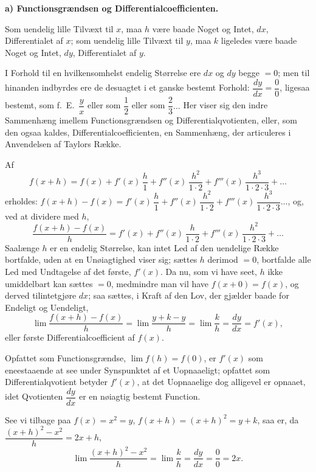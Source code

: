 \documentclass[12pt]{book}
\newcommand{\opage}[1]{\marginnote{\footnotesize\textit{[#1]}}}
\begin{document}
\begin{center}
\textbf{a) Functionsgrændsen og Differentialcoefficienten.}
\end{center}
{}

Som uendelig lille Tilvæxt til $x$, maa $h$ være baade Noget og Intet, $dx$,
Differentialet af $x$; som uendelig lille Tilvæxt til $y$, maa $k$ ligeledes være
baade Noget og Intet, $dy$, Differentialet af $y$.

I Forhold til en hvilkensomhelst endelig Størrelse ere $dx$ og $dy$ begge $= 0$;
men til hinanden indbyrdes ere de desuagtet i et ganske bestemt Forhold:
$\dfrac{dy}{dx} = \dfrac{0}{0}$, ligesaa bestemt, som f.\ E.\ $\dfrac{y}{x}$ eller
som $\dfrac{1}{2}$ eller som $\dfrac{2}{3} \dots$ Her viser sig den indre
Sammenhæng imellem Functionsgrændsen og Differentialqvotienten, eller, som den
ogsaa kaldes, Differentialcoefficienten, en Sammenhæng, der articuleres i
Anvendelsen af Taylors Række.

Af
\[
f(x + h) = f(x) + f'(x)\,\frac{h}{1} + f''(x)\,\frac{h^{2}}{1\cdot2}
+ f'''(x)\,\frac{h^{3}}{1\cdot2\cdot3} + \dots
\]
erholdes: $f(x + h) - f(x) = f'(x)\,\dfrac{h}{1} + f''(x)\,\dfrac{h^{2}}{1\cdot2}
+ f'''(x)\,\dfrac{h^{3}}{1\cdot2\cdot3} \dots$, og, ved at dividere med $h$,
\opage{56} \[
\frac{f(x + h) - f(x)}{h} = f'(x) + f''(x)\,\frac{h}{1\cdot2}
+ f'''(x)\,\frac{h^{2}}{1\cdot2\cdot3} + \dots
\]
Saalænge $h$ er en endelig Størrelse, kan intet Led af den uendelige Række
bortfalde, uden at en Unøiagtighed viser sig; sættes $h$ derimod $= 0$, bortfalde
alle Led med Undtagelse af det første, $f'(x)$. Da nu, som vi have seet, $h$ ikke
umiddelbart kan sættes $= 0$, medmindre man vil have $f(x + 0) = f(x)$, og derved
tilintetgjøre $dx$; saa sættes, i Kraft af den Lov, der gjælder baade for Endeligt
og Uendeligt,
\[
\lim\frac{f(x + h) - f(x)}{h} = \lim\frac{y + k - y}{h} = \lim\frac{k}{h}
= \frac{dy}{dx} = f'(x),
\]
eller første Differentialcoefficient af $f(x)$.

Opfattet som Functionsgrændse, $\lim f(h) = f(0)$, er $f'(x)$ som eneestaaende at
see under Synspunktet af et Uopnaaeligt; opfattet som Differentialqvotient betyder
$f'(x)$, at det Uopnaaelige dog alligevel er opnaaet, idet Qvotienten
$\dfrac{dy}{dx}$ er en nøiagtig bestemt Function.

See vi tilbage paa $f(x) = x^{2} = y$, $f(x + h) = (x + h)^{2} = y + k$, saa er, da
$\dfrac{(x + h)^{2} - x^{2}}{h} = 2x + h$,
\[
\lim\frac{(x + h)^{2} - x^{2}}{h} = \lim\frac{k}{h} = \frac{dy}{dx}
= \frac{0}{0} = 2x.
\]
\end{document}
